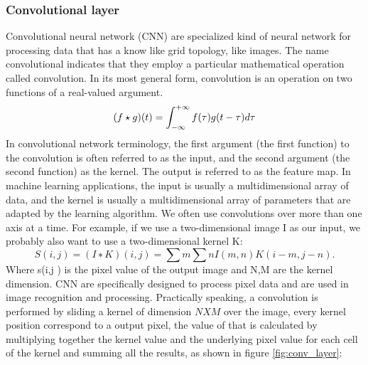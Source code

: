 \documentclass[a4paper, 10pt]{book}
\begin{document}
\subsubsection{Convolutional layer}
Convolutional neural network (CNN)  are specialized kind of neural network for processing data that has a know like grid topology, like images. The name convolutional indicates that they employ a particular mathematical operation called convolution.
In its most general form, convolution is an operation on two functions of a real-valued argument.
\begin{equation}
    \label{eqn:conv_layer}
(f\star g) (t) = \int_{-\infty}^{+\infty} f(\tau)g(t-\tau) d\tau \\
\end{equation}
 In convolutional network terminology, the first argument (the first function) to the convolution is often referred to as the input, and the second argument (the second function) as the kernel. The output is referred to as the feature map.
 In machine learning applications, the input is usually a multidimensional array of data, and the kernel is usually a multidimensional array of parameters that are adapted by the learning algorithm.
 We often use convolutions over more than one axis at a time. For example, if we use a two-dimensional image I as our input, we probably also want to use a two-dimensional kernel K:
 \begin{equation}
     \label{eqn:2_dimension_conv}
  S(i, j) = (I ∗ K)(i, j) =\sum m \sum n I(m, n)K(i − m, j − n).
 \end{equation}
Where s(i,j ) is the pixel value of the output image and N,M are the kernel dimension.
CNN are specifically designed to process pixel data and are used in image recognition and processing.
Practically speaking, a convolution is performed by sliding a kernel of dimension $ N X M $ over the image, every kernel position correspond to a output pixel, the value of that is calculated by multiplying together the kernel value and the underlying pixel value for each cell of the kernel and summing all the results, as shown in figure \ref{fig:conv_layer}:
\end{document}
